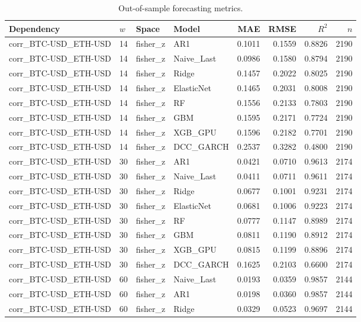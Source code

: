 \begin{table}[H]
\centering
\small
\caption{Out-of-sample forecasting metrics.}
\label{tab:metrics}
\begin{tabular}{llllrrrr}
\toprule
Dependency & $w$ & Space & Model & MAE & RMSE & $R^2$ & $n$ \\
\midrule
corr_BTC-USD_ETH-USD & 14 & fisher_z & AR1 & 0.1011 & 0.1559 & 0.8826 & 2190 \\
corr_BTC-USD_ETH-USD & 14 & fisher_z & Naive_Last & 0.0986 & 0.1580 & 0.8794 & 2190 \\
corr_BTC-USD_ETH-USD & 14 & fisher_z & Ridge & 0.1457 & 0.2022 & 0.8025 & 2190 \\
corr_BTC-USD_ETH-USD & 14 & fisher_z & ElasticNet & 0.1465 & 0.2031 & 0.8008 & 2190 \\
corr_BTC-USD_ETH-USD & 14 & fisher_z & RF & 0.1556 & 0.2133 & 0.7803 & 2190 \\
corr_BTC-USD_ETH-USD & 14 & fisher_z & GBM & 0.1595 & 0.2171 & 0.7724 & 2190 \\
corr_BTC-USD_ETH-USD & 14 & fisher_z & XGB_GPU & 0.1596 & 0.2182 & 0.7701 & 2190 \\
corr_BTC-USD_ETH-USD & 14 & fisher_z & DCC_GARCH & 0.2537 & 0.3282 & 0.4800 & 2190 \\
corr_BTC-USD_ETH-USD & 30 & fisher_z & AR1 & 0.0421 & 0.0710 & 0.9613 & 2174 \\
corr_BTC-USD_ETH-USD & 30 & fisher_z & Naive_Last & 0.0411 & 0.0711 & 0.9611 & 2174 \\
corr_BTC-USD_ETH-USD & 30 & fisher_z & Ridge & 0.0677 & 0.1001 & 0.9231 & 2174 \\
corr_BTC-USD_ETH-USD & 30 & fisher_z & ElasticNet & 0.0681 & 0.1006 & 0.9223 & 2174 \\
corr_BTC-USD_ETH-USD & 30 & fisher_z & RF & 0.0777 & 0.1147 & 0.8989 & 2174 \\
corr_BTC-USD_ETH-USD & 30 & fisher_z & GBM & 0.0811 & 0.1190 & 0.8912 & 2174 \\
corr_BTC-USD_ETH-USD & 30 & fisher_z & XGB_GPU & 0.0815 & 0.1199 & 0.8896 & 2174 \\
corr_BTC-USD_ETH-USD & 30 & fisher_z & DCC_GARCH & 0.1625 & 0.2103 & 0.6600 & 2174 \\
corr_BTC-USD_ETH-USD & 60 & fisher_z & Naive_Last & 0.0193 & 0.0359 & 0.9857 & 2144 \\
corr_BTC-USD_ETH-USD & 60 & fisher_z & AR1 & 0.0198 & 0.0360 & 0.9857 & 2144 \\
corr_BTC-USD_ETH-USD & 60 & fisher_z & Ridge & 0.0329 & 0.0523 & 0.9697 & 2144 \\

\end{tabular}
\end{table}
